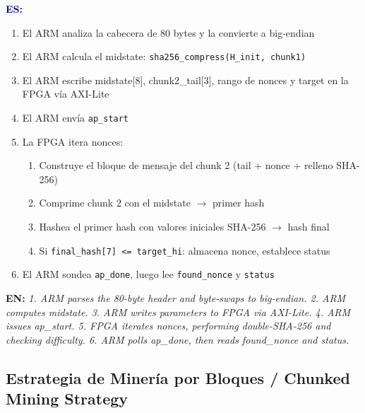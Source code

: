 \documentclass[12pt,a4paper]{article}
\newcommand{\bsubsection}[2]{%
    \subsection{#1 \textnormal{\small\color{accentblue}/ #2}}%
}
\newenvironment{bilingual}{%
    \par\medskip
}{%
    \par\medskip
}
\newcommand{\espara}[1]{\noindent\textcolor{darkblue}{\textbf{ES:}} #1\par\smallskip}
\newcommand{\enpara}[1]{\noindent\textcolor{accentblue}{\textbf{EN:}} \textit{#1}\par\smallskip}
\begin{document}
\begin{bilingual}
\espara{%
\begin{enumerate}[leftmargin=2em]
    \item El ARM analiza la cabecera de 80 bytes y la convierte a big-endian
    \item El ARM calcula el midstate: \texttt{sha256\_compress(H\_init, chunk1)}
    \item El ARM escribe midstate[8], chunk2\_tail[3], rango de nonces y target en la FPGA v\'ia AXI-Lite
    \item El ARM env\'ia \texttt{ap\_start}
    \item La FPGA itera nonces:
    \begin{enumerate}
        \item Construye el bloque de mensaje del chunk 2 (tail + nonce + relleno SHA-256)
        \item Comprime chunk 2 con el midstate $\rightarrow$ primer hash
        \item Hashea el primer hash con valores iniciales SHA-256 $\rightarrow$ hash final
        \item Si \texttt{final\_hash[7] <= target\_hi}: almacena nonce, establece status
    \end{enumerate}
    \item El ARM sondea \texttt{ap\_done}, luego lee \texttt{found\_nonce} y \texttt{status}
\end{enumerate}}

\enpara{%
1. ARM parses the 80-byte header and byte-swaps to big-endian.
2. ARM computes midstate.
3. ARM writes parameters to FPGA via AXI-Lite.
4. ARM issues ap\_start.
5. FPGA iterates nonces, performing double-SHA-256 and checking difficulty.
6. ARM polls ap\_done, then reads found\_nonce and status.}
\end{bilingual}

\bsubsection{Estrategia de Miner\'ia por Bloques}{Chunked Mining Strategy}
\end{document}
